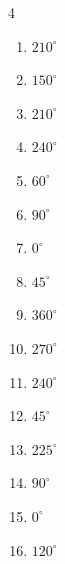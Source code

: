 \begin{multicols}{4}
\begin{enumerate}
  \item $\displaystyle 210^{\circ}$

  \item $\displaystyle 150^{\circ}$

  \item $\displaystyle 210^{\circ}$

  \item $\displaystyle 240^{\circ}$

  \item $\displaystyle 60^{\circ}$

  \item $\displaystyle 90^{\circ}$

  \item $\displaystyle 0^{\circ}$
        \phantom{$\displaystyle =0$}

  \item $\displaystyle 45^{\circ}$

  \item $\displaystyle 360^{\circ}$
        \phantom{$\displaystyle =2\pi$}

  \item $\displaystyle 270^{\circ}$

  \item $\displaystyle 240^{\circ}$

  \item $\displaystyle 45^{\circ}$

  \item $\displaystyle 225^{\circ}$

  \item $\displaystyle 90^{\circ}$

  \item $\displaystyle 0^{\circ}$
        \phantom{$\displaystyle =0$}

  \item $\displaystyle 120^{\circ}$


\end{enumerate}
\end{multicols}
